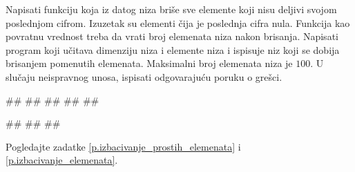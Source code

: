 \begin{Exercise}[label=v.brisanje_elemenata]
Napisati funkciju koja iz datog niza briše sve elemente koji nisu
deljivi svojom poslednjom cifrom. Izuzetak su elementi čija je poslednja
cifra nula. Funkcija kao povratnu vrednost treba
da vrati broj elemenata niza nakon brisanja. 
Napisati program koji učitava dimenziju niza i elemente niza i ispisuje niz koji se dobija  
brisanjem pomenutih elemenata. 
Maksimalni broj elemenata niza je $100$.
U slučaju neispravnog unosa, ispisati odgovarajuću poruku o grešci. 

\begin{miditest}
\begin{upotreba}{1}
#\naslovInt#
##
##
##
##
\end{upotreba}
\end{miditest}
\begin{miditest}
\begin{upotreba}{2}
#\naslovInt#
##
##
\end{upotreba}
\end{miditest}
\end{Exercise}

\ifresenja
\begin{Answer}[ref=v.brisanje_elemenata]

Pogledajte zadatke \ref{p.izbacivanje_prostih_elemenata} i \ref{p.izbacivanje_elemenata}.
\end{Answer}
\fi


